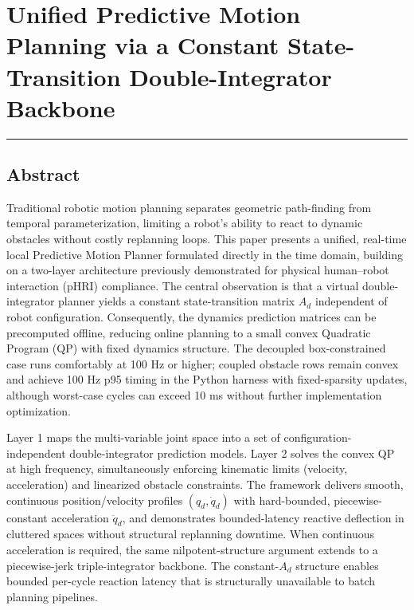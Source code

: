 \section{Unified Predictive Motion Planning via a Constant
State-Transition Double-Integrator
Backbone}\label{unified-predictive-motion-planning-via-a-constant-state-transition-double-integrator-backbone}

\begin{center}\rule{0.5\linewidth}{0.5pt}\end{center}

\subsection{Abstract}\label{abstract}

Traditional robotic motion planning separates geometric path-finding
from temporal parameterization, limiting a robot's ability to react to
dynamic obstacles without costly replanning loops. This paper presents a
unified, real-time local Predictive Motion Planner formulated directly
in the time domain, building on a two-layer architecture previously
demonstrated for physical human--robot interaction (pHRI) compliance.
The central observation is that a virtual double-integrator planner
yields a constant state-transition matrix \(A_d\) independent of robot
configuration. Consequently, the dynamics prediction matrices can be
precomputed offline, reducing online planning to a small convex
Quadratic Program (QP) with fixed dynamics structure. The decoupled
box-constrained case runs comfortably at 100 Hz or higher; coupled
obstacle rows remain convex and achieve 100 Hz p95 timing in the Python
harness with fixed-sparsity updates, although worst-case cycles can
exceed 10 ms without further implementation optimization.

Layer 1 maps the multi-variable joint space into a set of
configuration-independent double-integrator prediction models. Layer 2
solves the convex QP at high frequency, simultaneously enforcing
kinematic limits (velocity, acceleration) and linearized obstacle
constraints. The framework delivers smooth, continuous position/velocity
profiles \((q_d, \dot{q}_d)\) with hard-bounded, piecewise-constant
acceleration \(\ddot{q}_d\), and demonstrates bounded-latency reactive
deflection in cluttered spaces without structural replanning downtime.
When continuous acceleration is required, the same nilpotent-structure
argument extends to a piecewise-jerk triple-integrator backbone. The
constant-\(A_d\) structure enables bounded per-cycle reaction latency
that is structurally unavailable to batch planning pipelines.


